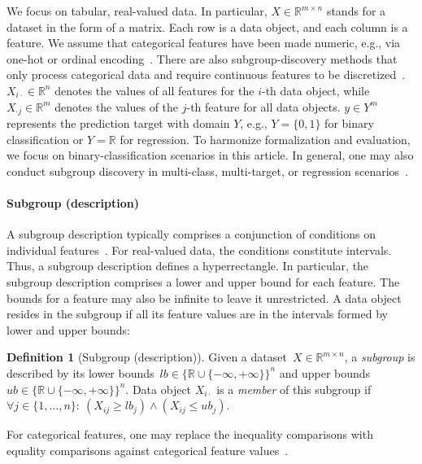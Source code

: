 \documentclass{article}
\theoremstyle{definition}
\newtheorem{definition}{Definition}
\begin{document}
We focus on tabular, real-valued data.
In particular, $X \in \mathbb{R}^{m \times n}$ stands for a dataset in the form of a matrix.
Each row is a data object, and each column is a feature.
We assume that categorical features have been made numeric, e.g., via one-hot or ordinal encoding~\cite{matteucci2023benchmark}.
There are also subgroup-discovery methods that only process categorical data and require continuous features to be discretized~\cite{herrera2011overview, meeng2021real}.
$X_{i \cdot} \in \mathbb{R}^n$ denotes the values of all features for the $i$-th data object,
while $X_{\cdot j} \in \mathbb{R}^m$ denotes the values of the $j$-th feature for all data objects.
$y \in Y^m$ represents the prediction target with domain $Y$, e.g., $Y=\{0,1\}$ for binary classification or $Y=\mathbb{R}$ for regression.
To harmonize formalization and evaluation, we focus on binary-classification scenarios in this article.
In general, one may also conduct subgroup discovery in multi-class, multi-target, or regression scenarios~\cite{atzmueller2015subgroup}.

\paragraph{Subgroup (description)}

A subgroup description typically comprises a conjunction of conditions on individual features~\cite{meeng2021real}.
For real-valued data, the conditions constitute intervals.
Thus, a subgroup description defines a hyperrectangle.
In particular, the subgroup description comprises a lower and upper bound for each feature.
The bounds for a feature may also be infinite to leave it unrestricted.
A data object resides in the subgroup if all its feature values are in the intervals formed by lower and upper bounds:
%
\begin{definition}[Subgroup (description)]
	Given a dataset~$X \in \mathbb{R}^{m \times n}$, a \emph{subgroup} is described by its lower bounds~$\mathit{lb} \in \{\mathbb{R} \cup \{-\infty, +\infty\}\}^n$ and upper bounds~$\mathit{ub} \in \{\mathbb{R} \cup \{-\infty, +\infty\}\}^n$.
	Data object $X_{i \cdot}$ is a \emph{member} of this subgroup if $\forall j \in \{1, \dots, n\}:~ \left( X_{ij} \geq \mathit{lb}_j \right) \land \left( X_{ij} \leq \mathit{ub}_j \right)$.
	\label{def:csd:subgroup}
\end{definition}
%
For categorical features, one may replace the inequality comparisons with equality comparisons against categorical feature values~\cite{atzmueller2015subgroup}.
\end{document}
